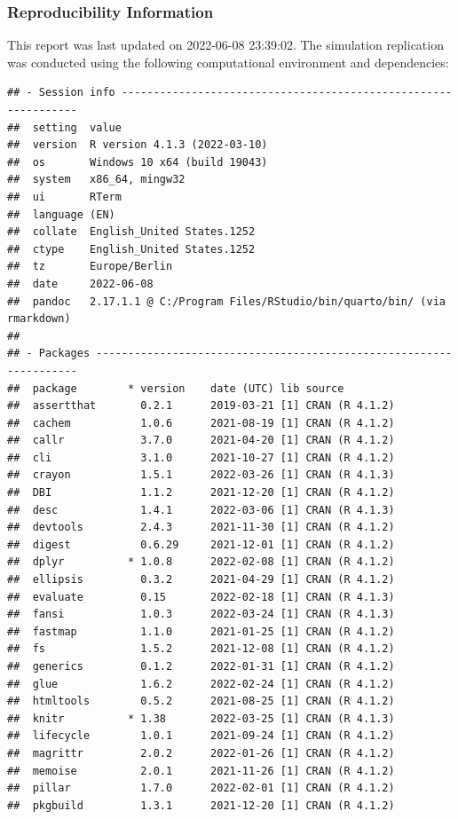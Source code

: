 \documentclass[10,a4paperpaper,]{article}
\begin{document}
\subsubsection*{Reproducibility Information}

This report was last updated on 2022-06-08 23:39:02. The simulation
replication was conducted using the following computational environment
and dependencies:

\FloatBarrier

\begin{verbatim}
## - Session info ---------------------------------------------------------------
##  setting  value
##  version  R version 4.1.3 (2022-03-10)
##  os       Windows 10 x64 (build 19043)
##  system   x86_64, mingw32
##  ui       RTerm
##  language (EN)
##  collate  English_United States.1252
##  ctype    English_United States.1252
##  tz       Europe/Berlin
##  date     2022-06-08
##  pandoc   2.17.1.1 @ C:/Program Files/RStudio/bin/quarto/bin/ (via rmarkdown)
## 
## - Packages -------------------------------------------------------------------
##  package        * version    date (UTC) lib source
##  assertthat       0.2.1      2019-03-21 [1] CRAN (R 4.1.2)
##  cachem           1.0.6      2021-08-19 [1] CRAN (R 4.1.2)
##  callr            3.7.0      2021-04-20 [1] CRAN (R 4.1.2)
##  cli              3.1.0      2021-10-27 [1] CRAN (R 4.1.2)
##  crayon           1.5.1      2022-03-26 [1] CRAN (R 4.1.3)
##  DBI              1.1.2      2021-12-20 [1] CRAN (R 4.1.2)
##  desc             1.4.1      2022-03-06 [1] CRAN (R 4.1.3)
##  devtools         2.4.3      2021-11-30 [1] CRAN (R 4.1.2)
##  digest           0.6.29     2021-12-01 [1] CRAN (R 4.1.2)
##  dplyr          * 1.0.8      2022-02-08 [1] CRAN (R 4.1.2)
##  ellipsis         0.3.2      2021-04-29 [1] CRAN (R 4.1.2)
##  evaluate         0.15       2022-02-18 [1] CRAN (R 4.1.3)
##  fansi            1.0.3      2022-03-24 [1] CRAN (R 4.1.3)
##  fastmap          1.1.0      2021-01-25 [1] CRAN (R 4.1.2)
##  fs               1.5.2      2021-12-08 [1] CRAN (R 4.1.2)
##  generics         0.1.2      2022-01-31 [1] CRAN (R 4.1.2)
##  glue             1.6.2      2022-02-24 [1] CRAN (R 4.1.2)
##  htmltools        0.5.2      2021-08-25 [1] CRAN (R 4.1.2)
##  knitr          * 1.38       2022-03-25 [1] CRAN (R 4.1.3)
##  lifecycle        1.0.1      2021-09-24 [1] CRAN (R 4.1.2)
##  magrittr         2.0.2      2022-01-26 [1] CRAN (R 4.1.2)
##  memoise          2.0.1      2021-11-26 [1] CRAN (R 4.1.2)
##  pillar           1.7.0      2022-02-01 [1] CRAN (R 4.1.2)
##  pkgbuild         1.3.1      2021-12-20 [1] CRAN (R 4.1.2)

\end{verbatim}
\end{document}
